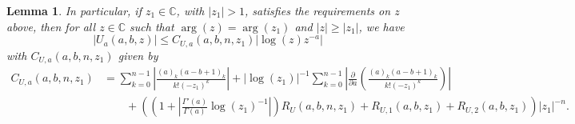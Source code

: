 \documentclass[11pt]{article}
\newtheorem{lemma}[definition]{Lemma}
\begin{document}
\begin{lemma}
  In particular, if \(z_1 \in \mathbb{C}\), with \(|z_{1}| > 1\),
  satisfies the requirements on \(z\) above, then for all
  \(z \in \mathbb{C}\) such that \(\arg(z) = \arg(z_{1})\) and
  \(|z| \geq |z_1|\), we have
  \begin{equation*}
    |U_a(a, b, z)| \leq C_{U,a}(a,b,n,z_{1})|\log(z)z^{-a}|
  \end{equation*}
  with \(C_{U,a}(a,b,n,z_{1})\) given by
  \begin{align*}
    C_{U,a}(a,b,n,z_{1})
    &= \sum_{k = 0}^{n - 1}\left|\frac{(a)_{k}(a - b + 1)_{k}}{k!(-z_{1})^{k}}\right|
      + |\log(z_{1})|^{-1}\sum_{k = 0}^{n - 1}\left|\frac{\partial}{\partial a}\left(
      \frac{(a)_{k}(a - b + 1)_{k}}{k!(-z_{1})^{k}}
      \right)\right|\\
    &\qquad+ \left(
      \left(1 + \left|\frac{\Gamma'(a)}{\Gamma(a)}\log(z_{1})^{-1}\right|\right)R_{U}(a, b, n, z_{1})
      + R_{U,1}(a, b, z_{1}) + R_{U,2}(a, b, z_{1})
      \right)|z_{1}|^{-n}.
  \end{align*}
\end{lemma}
\end{document}
